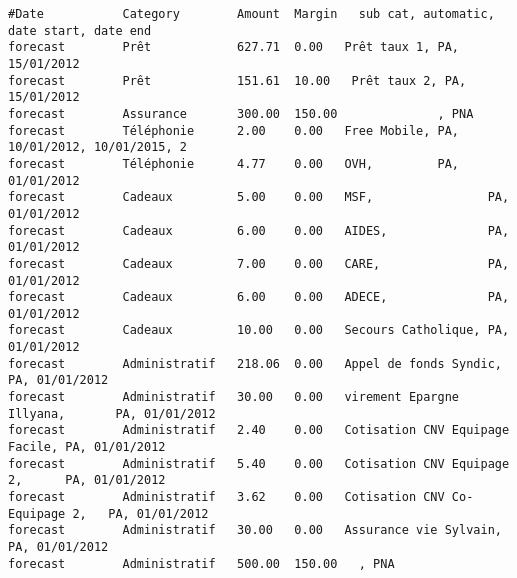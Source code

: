 \linenumbers
\footnotesize
\begin{verbatim}
#Date           Category        Amount  Margin   sub cat, automatic, date start, date end
forecast        Prêt            627.71  0.00   Prêt taux 1, PA, 15/01/2012
forecast        Prêt            151.61  10.00   Prêt taux 2, PA, 15/01/2012
forecast        Assurance       300.00  150.00              , PNA
forecast        Téléphonie      2.00    0.00   Free Mobile, PA, 10/01/2012, 10/01/2015, 2
forecast        Téléphonie      4.77    0.00   OVH,         PA, 01/01/2012
forecast        Cadeaux         5.00    0.00   MSF,                PA, 01/01/2012
forecast        Cadeaux         6.00    0.00   AIDES,              PA, 01/01/2012
forecast        Cadeaux         7.00    0.00   CARE,               PA, 01/01/2012
forecast        Cadeaux         6.00    0.00   ADECE,              PA, 01/01/2012
forecast        Cadeaux         10.00   0.00   Secours Catholique, PA, 01/01/2012
forecast        Administratif   218.06  0.00   Appel de fonds Syndic,          PA, 01/01/2012
forecast        Administratif   30.00   0.00   virement Epargne Illyana,       PA, 01/01/2012
forecast        Administratif   2.40    0.00   Cotisation CNV Equipage Facile, PA, 01/01/2012
forecast        Administratif   5.40    0.00   Cotisation CNV Equipage 2,      PA, 01/01/2012
forecast        Administratif   3.62    0.00   Cotisation CNV Co-Equipage 2,   PA, 01/01/2012
forecast        Administratif   30.00   0.00   Assurance vie Sylvain,          PA, 01/01/2012
forecast        Administratif   500.00  150.00   , PNA
\end{verbatim}
\nolinenumbers
\normalsize
